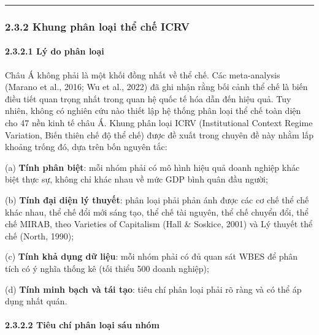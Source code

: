 \documentclass[12pt,a4paper]{article}
\begin{document}
\begin{center}\rule{0.5\linewidth}{0.5pt}\end{center}

\hypertarget{232-khung-phuxe2n-loux1ea1i-thux1ec3-chux1ebf-icrv}{%
\subsubsection{2.3.2 Khung phân loại thể chế
ICRV}\label{232-khung-phuxe2n-loux1ea1i-thux1ec3-chux1ebf-icrv}}

\hypertarget{2321-luxfd-do-phuxe2n-loux1ea1i}{%
\paragraph{2.3.2.1 Lý do phân
loại}\label{2321-luxfd-do-phuxe2n-loux1ea1i}}

Châu Á không phải là một khối đồng nhất về thể chế. Các meta-analysis
(Marano et al., 2016; Wu et al., 2022) đã ghi nhận rằng bối cảnh thể chế
là biến điều tiết quan trọng nhất trong quan hệ quốc tế hóa dẫn đến hiệu
quả. Tuy nhiên, không có nghiên cứu nào thiết lập hệ thống phân loại thể
chế toàn diện cho 47 nền kinh tế châu Á. Khung phân loại ICRV
(Institutional Context Regime Variation, Biến thiên chế độ thể chế) được
đề xuất trong chuyên đề này nhằm lấp khoảng trống đó, dựa trên bốn
nguyên tắc:

(a) \textbf{Tính phân biệt}: mỗi nhóm phải có mô hình hiệu quả doanh
nghiệp khác biệt thực sự, không chỉ khác nhau về mức GDP bình quân đầu
người;

(b) \textbf{Tính đại diện lý thuyết}: phân loại phải phản ánh được các
cơ chế thể chế khác nhau, thể chế đổi mới sáng tạo, thể chế tài nguyên,
thể chế chuyển đổi, thể chế MIRAB, theo Varieties of Capitalism (Hall \&
Soskice, 2001) và Lý thuyết thể chế (North, 1990);

(c) \textbf{Tính khả dụng dữ liệu}: mỗi nhóm phải có đủ quan sát WBES để
phân tích có ý nghĩa thống kê (tối thiểu 500 doanh nghiệp);

(d) \textbf{Tính minh bạch và tái tạo}: tiêu chí phân loại phải rõ ràng
và có thể áp dụng nhất quán.

\hypertarget{2322-tiuxeau-chuxed-phuxe2n-loux1ea1i-suxe1u-nhuxf3m}{%
\paragraph{2.3.2.2 Tiêu chí phân loại sáu
nhóm}\label{2322-tiuxeau-chuxed-phuxe2n-loux1ea1i-suxe1u-nhuxf3m}}
\end{document}
